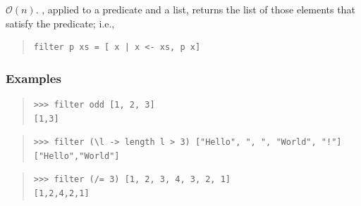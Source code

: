 \begin{haddockdesc}
\item[\begin{tabular}{@{}l}
filter :: (a -> Bool) -> {\char 91}a{\char 93} -> {\char 91}a{\char 93}
\end{tabular}]
{\haddockbegindoc
\(\mathcal{O}(n)\). , applied to a predicate and a list, returns
 the list of those elements that satisfy the predicate; i.e.,\par
\begin{quote}
{\haddockverb\begin{verbatim}
filter p xs = [ x | x <- xs, p x]\end{verbatim}}
\end{quote}
\subsubsection*{\textbf{Examples}}
\begin{quote}
{\haddockverb\begin{verbatim}
>>> filter odd [1, 2, 3]
[1,3]

\end{verbatim}}
\end{quote}
\begin{quote}
{\haddockverb\begin{verbatim}
>>> filter (\l -> length l > 3) ["Hello", ", ", "World", "!"]
["Hello","World"]

\end{verbatim}}
\end{quote}
\begin{quote}
{\haddockverb\begin{verbatim}
>>> filter (/= 3) [1, 2, 3, 4, 3, 2, 1]
[1,2,4,2,1]

\end{verbatim}}
\end{quote}}
\end{haddockdesc}
